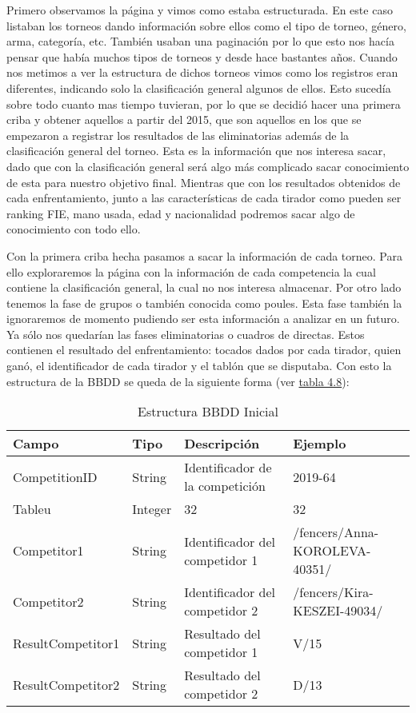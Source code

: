 Primero observamos la página y vimos como estaba estructurada. En este caso listaban
los torneos dando información sobre ellos como el tipo de torneo, género, arma, categoría,
etc. También usaban una paginación por lo que esto nos hacía pensar que había muchos tipos
de torneos y desde hace bastantes años. Cuando nos metimos a ver la estructura de dichos torneos
vimos como los registros eran diferentes, indicando solo la clasificación general algunos de ellos.
Esto sucedía sobre todo cuanto mas tiempo tuvieran, por lo que se decidió hacer una primera
criba y obtener aquellos a partir del 2015, que son aquellos en los que se empezaron a registrar
los resultados de las eliminatorias además de la clasificación general del torneo. Esta es la
información que nos interesa sacar, dado que con la clasificación general será algo más
complicado sacar conocimiento de esta para nuestro objetivo final. Mientras que con los
resultados obtenidos de cada enfrentamiento, junto a las características de cada tirador
como pueden ser ranking \acs{FIE}, mano usada, edad y nacionalidad podremos sacar algo de
conocimiento con todo ello.

Con la primera criba hecha pasamos a sacar la información de cada torneo. Para ello exploraremos
la página con la información de cada competencia la cual contiene la clasificación general,
la cual no nos interesa almacenar. Por otro lado tenemos la fase de grupos o también
conocida como poules. Esta fase también la ignoraremos de momento pudiendo ser esta
información a analizar en un futuro. Ya sólo nos quedarían las fases eliminatorias o
cuadros de directas. Estos contienen el resultado del enfrentamiento: tocados dados por cada tirador,
quien ganó, el identificador de cada tirador y el tablón que se disputaba. Con esto la estructura de la \acs{BBDD}
se queda de la siguiente forma (ver \hyperref[tab:Estructura BBDD Inicial iteracion5]{tabla 4.8}):

\begin{table}[]
  \centering
  \caption{Estructura \acs{BBDD} Inicial}
  \label{tab:Estructura BBDD Inicial iteracion5}
  \begin{tabular}{|llll|}
    \hline \rowcolor[HTML]{C0C0C0}
    Campo & Tipo & Descripción & Ejemplo \\ \hline
    CompetitionID & String & Identificador de la competición & 2019-64 \\ \hline
    Tableu & Integer & 32 & 32 \\ \hline
    Competitor1 & String & Identificador del competidor 1 & /fencers/Anna-KOROLEVA-40351/ \\ \hline
    Competitor2 & String & Identificador del competidor 2 & /fencers/Kira-KESZEI-49034/ \\ \hline
    ResultCompetitor1 & String & Resultado del competidor 1 & V/15 \\ \hline
    ResultCompetitor2 & String & Resultado del competidor 2 & D/13 \\ \hline
  \end{tabular}
\end{table}

